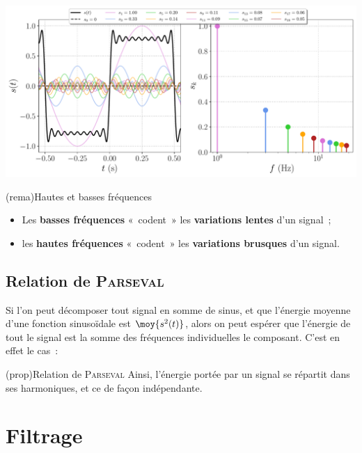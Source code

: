 \documentclass[../../main/main.tex]{subfiles}
\begin{document}
\begin{tcb*}[breakable]
	\begin{minipage}{\linewidth}
		\centering
		\includegraphics[width=.85\linewidth]{fft_creneau}
	\end{minipage}
\end{tcb*}

\begin{tcb*}(rema){Hautes et basses fréquences}
	\begin{itemize}
		\item Les \textbf{basses fréquences} «~codent~» les \textbf{variations
			      lentes} d'un signal~;
		\item les \textbf{hautes fréquences} «~codent~» les \textbf{variations
			      brusques} d'un signal.
	\end{itemize}
\end{tcb*}

\subsection{Relation de \textsc{Parseval}}
Si l'on peut décomposer tout signal en somme de sinus, et que l'énergie moyenne
d'une fonction sinusoïdale est $\moy{s^{2}(t)}$, alors on peut espérer que
l'énergie de tout le signal est la somme des fréquences individuelles  le
composant. C'est en effet le cas~:
\begin{tcb*}(prop){Relation de \textsc{Parseval}}
	\psw{
	\[
		\moy{s^{2}(t)} = s^{2}\ind{eff} =
		S_0{}^{2} + \frac{1}{2} \sum_{n=1}^{+\infty} S_n{}^{2}
	\]
	}
	Ainsi, l'énergie portée par un signal se répartit dans ses harmoniques, et ce
	de façon indépendante.
\end{tcb*}

\section{Filtrage}
\end{document}
